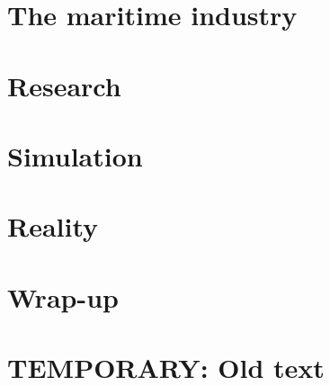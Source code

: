 \documentclass[a3paper,11pt,oneside]{book}
\begin{document}
\frontmatter


\makeCover %

\listoftodos[Notes]
\clearpage





\clearpage
\setcounter{tocdepth}{1}
\tableofcontents
\clearpage

\mainmatter


\part{The maritime industry}



\part{Research}




\part{Simulation}




\part{Reality}







\part{Wrap-up}




\backmatter

\part{TEMPORARY: Old text}







\end{document}

